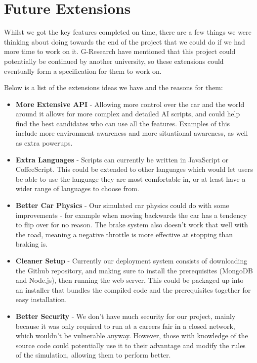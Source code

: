 \section{Future Extensions}

Whilst we got the key features completed on time, there are a few things we were thinking about doing towards the end of the project that we could do if we had more time to work on it. G-Research have mentioned that this project could potentially be continued by another university, so these extensions could eventually form a specification for them to work on.

Below is a list of the extensions ideas we have and the reasons for them:

\begin{itemize}
    \item
        \textbf{More Extensive API} - Allowing more control over the car and the world around it allows for more complex and detailed AI scripts, and could help find the best candidates who can use all the features.  Examples of this include more environment awareness and more situational awareness, as well as extra powerups.
    \item
        \textbf{Extra Languages} - Scripts can currently be written in JavaScript or CoffeeScript. This could be extended to other languages which would let users be able to use the language they are most comfortable in, or at least have a wider range of languages to choose from.
    \item
        \textbf{Better Car Physics} - Our simulated car physics could do with some improvements - for example when moving backwards the car has a tendency to flip over for no reason. The brake system also doesn't work that well with the road, meaning a negative throttle is more effective at stopping than braking is.
    \item
        \textbf{Cleaner Setup} - Currently our deployment system consists of downloading the Github repository, and making sure to install the prerequisites (MongoDB and Node.js), then running the web server. This could be packaged up into an installer that bundles the compiled code and the prerequisites together for easy installation.
    \item
        \textbf{Better Security} - We don't have much security for our project, mainly because it was only required to run at a careers fair in a closed network, which wouldn't be vulnerable anyway. However, those with knowledge of the source code could potentially use it to their advantage and modify the rules of the simulation, allowing them to perform better.

\end{itemize}
